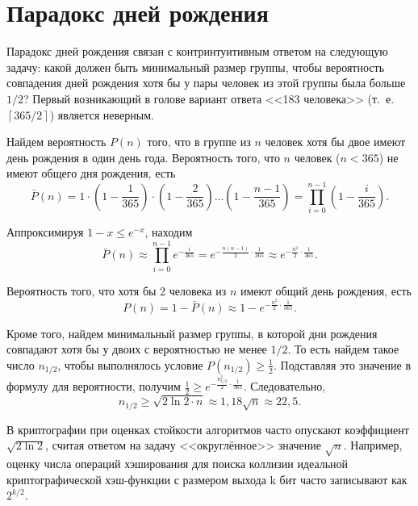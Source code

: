 \section{Парадокс дней рождения}\label{section-birthday-padradox}

Парадокс дней рождения связан с контринтуитивным ответом на следующую задачу: какой должен быть минимальный размер группы, чтобы вероятность совпадения дней рождения хотя бы у пары человек из этой группы была больше $1 / 2$? Первый возникающий в голове вариант ответа <<183 человека>> (т.~е. $\left\lceil 365 / 2 \right\rceil$) является неверным.

Найдем вероятность $P(n)$ того, что в группе из $n$ человек хотя бы двое имеют день рождения в один день года. Вероятность того, что $n$ человек ($n < 365$) не имеют общего дня рождения, есть
\[
    \bar{P}(n) = 1 \cdot \left( 1 - \frac{1}{365} \right) \cdot \left(1 - \frac{2}{365} \right)  \dots  \left( 1 - \frac{n-1}{365} \right) = \prod\limits_{i=0}^{n-1} \left( 1 - \frac{i}{365} \right).
\]

Аппроксимируя $1-x \leq e^{-x}$, находим
    \[ \bar{P}(n) \approx \prod\limits_{i=0}^{n-1} e^{-\frac{i}{365}} = e^{-\frac{n(n-1)}{2} \cdot \frac{1}{365}} \approx e^{-\frac{n^2}{2} \cdot \frac{1}{365}}. \]

Вероятность того, что хотя бы 2 человека из $n$ имеют общий день рождения, есть
    \[ P(n) = 1 - \bar{P}(n) \approx 1 -  e^{-\frac{n^2}{2} \cdot \frac{1}{365}}. \]

Кроме того, найдем минимальный размер группы, в которой дни рождения совпадают хотя бы у двоих с вероятностью не менее $1/2$. То есть найдем такое число $n_{1/2}$, чтобы выполнялось условие $P(n_{1/2}) \geq \frac{1}{2}$. Подставляя это значение в формулу для вероятности, получим $\frac{1}{2} \geq e^{-\frac{n_{1/2}^2}{2} \cdot \frac{1}{365}}$. Следовательно,
	\[n_{1/2} \geq \sqrt{2 \ln 2 \cdot n} \approx 1,18 \sqrt{ n } \approx 22,5.\]
	
В криптографии при оценках стойкости алгоритмов часто опускают коэффициент $\sqrt{2 \ln 2}$, считая ответом на задачу <<округлённое>> значение $\sqrt{ n }$. Например, оценку числа операций хэширования для поиска коллизии идеальной криптографической хэш-функции с размером выхода k бит часто записывают как $2^{k/2}$.
